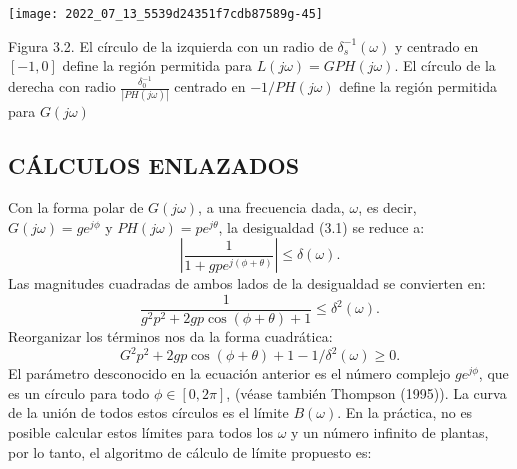 \texttt{[image: 2022\_07\_13\_5539d24351f7cdb87589g-45]}

Figura 3.2. El círculo de la izquierda con un radio de $\delta_{s}^{-1}(\omega)$ y centrado en $[-1,0]$ define la región permitida para $L(j \omega)=G P H(j \omega)$. El círculo de la derecha con radio $\frac{\delta_{0}^{-1}}{| P H(j \omega)|} $ centrado en $-1 / P H(j \omega)$ define la región permitida para $G(j \omega)$

\subsection{CÁLCULOS ENLAZADOS}
Con la forma polar de $G(j \omega)$, a una frecuencia dada, $\omega$, es decir, $G(j \omega)=g e^{j \phi}$ y $P H(j \omega)=p e^{j \theta}$, la desigualdad (3.1) se reduce a:
$$
\left|\frac{1}{1+g p e^{j(\phi+\theta)}}\right| \leq \delta(\omega) .
$$
Las magnitudes cuadradas de ambos lados de la desigualdad se convierten en:
$$
\frac{1}{g^{2} p^{2}+2 g p \cos (\phi+\theta)+1} \leq \delta^{2}(\omega) .
$$
Reorganizar los términos nos da la forma cuadrática:
$$
G^{2} p^{2}+2 g p \cos (\phi+\theta)+1-1 / \delta^{2}(\omega) \geq 0 .
$$
El parámetro desconocido en la ecuación anterior es el número complejo $g e^{j \phi}$, que es un círculo para todo $\phi \in[0,2 \pi]$, (véase también Thompson (1995)). La curva de la unión de todos estos círculos es el límite $B(\omega)$. En la práctica, no es posible calcular estos límites para todos los $\omega$ y un número infinito de plantas, por lo tanto, el algoritmo de cálculo de límite propuesto es:

